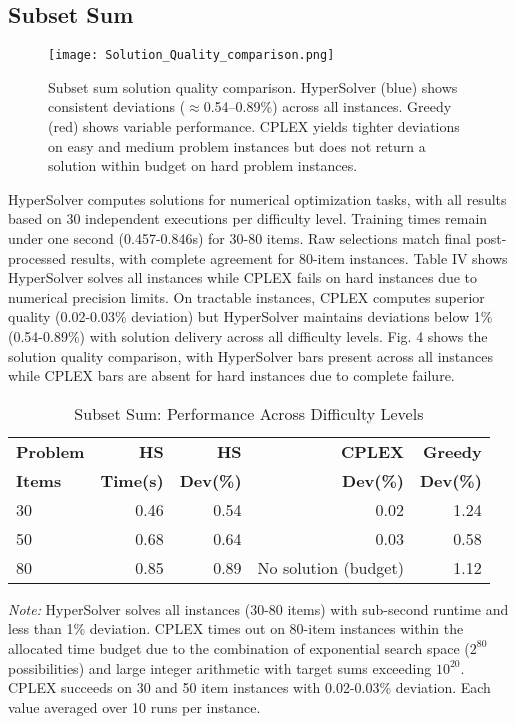 \documentclass[conference]{IEEEtran}
\begin{document}
\subsection{Subset Sum}
\begin{figure}
    \centering
    \texttt{[image: Solution\_Quality\_comparison.png]}
    \caption{Subset sum solution quality comparison. HyperSolver (blue) shows consistent deviations ($\approx$0.54–0.89\%) across all instances. Greedy (red) shows variable performance. CPLEX yields tighter deviations on easy and medium problem instances but does not return a solution within budget on hard problem instances.}
    \label{fig:subset-quality}
\end{figure}

HyperSolver computes solutions for numerical optimization tasks, with all results based on 30 independent executions per difficulty level. Training times remain under one second (0.457-0.846s) for 30-80 items. Raw selections match final post-processed results, with complete agreement for 80-item instances. Table IV shows HyperSolver solves all instances while CPLEX fails on hard instances due to numerical precision limits. On tractable instances, CPLEX computes superior quality (0.02-0.03\% deviation) but HyperSolver maintains deviations below 1\% (0.54-0.89\%) with solution delivery across all difficulty levels. Fig. 4 shows the solution quality comparison, with HyperSolver bars present across all instances while CPLEX bars are absent for hard instances due to complete failure.

\begin{table}[htbp]
\centering
\caption{Subset Sum: Performance Across Difficulty Levels}
\label{tab:subsetsum}
\footnotesize
\setlength{\tabcolsep}{6pt}
\begin{tabular}{|l|r|r|r|r|}
\hline
\textbf{Problem} & \textbf{HS} & \textbf{HS} & \textbf{CPLEX} & \textbf{Greedy} \\
\textbf{Items} & \textbf{Time(s)} & \textbf{Dev(\%)} & \textbf{Dev(\%)} & \textbf{Dev(\%)} \\
\hline
30 & 0.46 & 0.54 & 0.02 & 1.24 \\
50 & 0.68 & 0.64 & 0.03 & 0.58 \\
80 & 0.85 & 0.89 & No solution (budget) & 1.12 \\
\hline
\end{tabular}
\begin{flushleft}
\vspace{1pt}
\footnotesize
\textit{Note:} HyperSolver solves all instances (30-80 items) with sub-second runtime and less than 1\% deviation. CPLEX times out on 80-item instances within the allocated time budget due to the combination of exponential search space (\(2^{80}\) possibilities) and large integer arithmetic with target sums exceeding \(10^{20}\). CPLEX succeeds on 30 and 50 item instances with 0.02-0.03\% deviation. Each value averaged over 10 runs per instance.
\end{flushleft}
\end{table}
\end{document}
